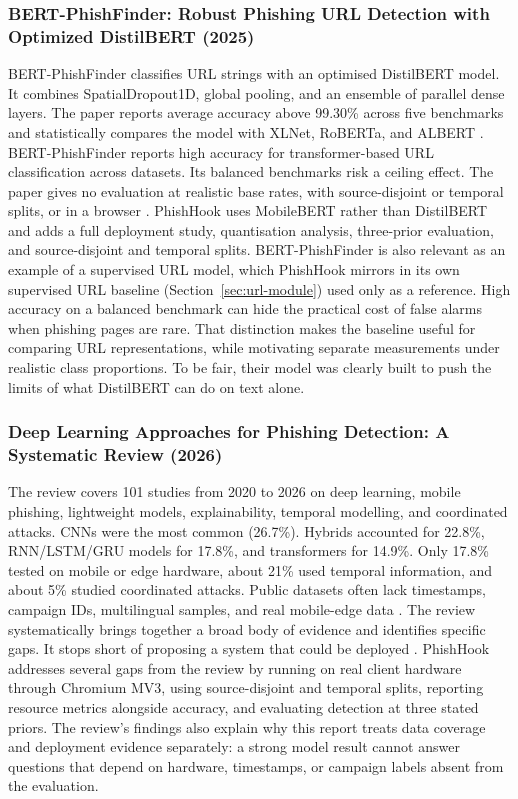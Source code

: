 \documentclass{FastFyp}
\begin{document}
\subsubsection{BERT-PhishFinder: Robust Phishing URL Detection with Optimized DistilBERT (2025)}
BERT-PhishFinder classifies URL strings with an optimised DistilBERT model. It combines SpatialDropout1D, global pooling, and an ensemble of parallel dense layers. The paper reports average accuracy above 99.30\% across five benchmarks and statistically compares the model with XLNet, RoBERTa, and ALBERT \cite{bertphishfinder2025}. BERT-PhishFinder reports high accuracy for transformer-based URL classification across datasets. Its balanced benchmarks risk a ceiling effect. The paper gives no evaluation at realistic base rates, with source-disjoint or temporal splits, or in a browser \cite{bertphishfinder2025}. PhishHook uses MobileBERT rather than DistilBERT and adds a full deployment study, quantisation analysis, three-prior evaluation, and source-disjoint and temporal splits. BERT-PhishFinder is also relevant as an example of a supervised URL model, which PhishHook mirrors in its own supervised URL baseline (Section~\ref{sec:url-module}) used only as a reference. High accuracy on a balanced benchmark can hide the practical cost of false alarms when phishing pages are rare. That distinction makes the baseline useful for comparing URL representations, while motivating separate measurements under realistic class proportions. To be fair, their model was clearly built to push the limits of what DistilBERT can do on text alone. 

\subsubsection{Deep Learning Approaches for Phishing Detection: A Systematic Review (2026)}
The review covers 101 studies from 2020 to 2026 on deep learning, mobile phishing, lightweight models, explainability, temporal modelling, and coordinated attacks. CNNs were the most common (26.7\%). Hybrids accounted for 22.8\%, RNN/LSTM/GRU models for 17.8\%, and transformers for 14.9\%. Only 17.8\% tested on mobile or edge hardware, about 21\% used temporal information, and about 5\% studied coordinated attacks. Public datasets often lack timestamps, campaign IDs, multilingual samples, and real mobile-edge data \cite{dlsurvey2026}. The review systematically brings together a broad body of evidence and identifies specific gaps. It stops short of proposing a system that could be deployed \cite{dlsurvey2026}. PhishHook addresses several gaps from the review by running on real client hardware through Chromium MV3, using source-disjoint and temporal splits, reporting resource metrics alongside accuracy, and evaluating detection at three stated priors. The review's findings also explain why this report treats data coverage and deployment evidence separately: a strong model result cannot answer questions that depend on hardware, timestamps, or campaign labels absent from the evaluation.
\end{document}
